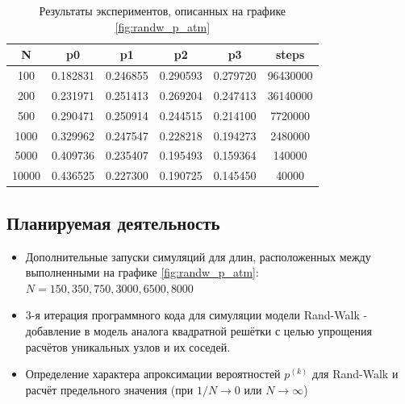 \begin{table}[h]
\centering
\begin{tabular}{|c|c|c|c|c|c|}
\hline
N & p0 & p1 & p2 & p3 & steps \\ \hline
100 & 0.182831 & 0.246855 & 0.290593 & 0.279720 & 96430000 \\ \hline 
200 & 0.231971 & 0.251413 & 0.269204 & 0.247413 & 36140000 \\ \hline
500 & 0.290471 & 0.250914 & 0.244515 & 0.214100 & 7720000 \\ \hline
1000 & 0.329962 & 0.247547 & 0.228218 & 0.194273 & 2480000 \\ \hline
5000 & 0.409736 & 0.235407 & 0.195493 & 0.159364 & 140000 \\ \hline
10000 & 0.436525 & 0.227300 & 0.190725 & 0.145450 & 40000 \\ \hline
\end{tabular}
\caption{Результаты экспериментов, описанных на графике \ref{fig:randw_p_atm}}
\label{tab:randw_p_atm}
\end{table}


\subsection{Планируемая деятельность}

\begin{itemize}
\item Дополнительные запуски симуляций для длин, расположенных между выполненными на графике \ref{fig:randw_p_atm}: $N=150, 350, 750, 3000, 6500, 8000$
\item 3-я итерация программного кода для симуляции модели Rand-Walk - добавление в модель аналога квадратной решётки с целью упрощения расчётов уникальных узлов и их соседей.
\item  Определение характера апроксимации вероятностей $p^{(k)}$ для Rand-Walk и расчёт предельного значения (при $1/N \to 0$ или $N \to \infty$)
\end{itemize}

